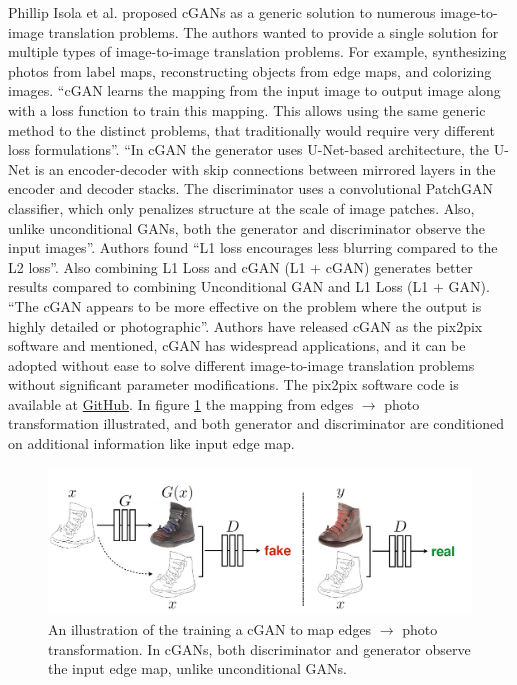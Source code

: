 Phillip Isola et al.\cite{isola2018imagetoimage} proposed \acp{cGAN} as a generic solution to numerous image-to-image translation problems. The authors wanted to provide a single solution for multiple types of image-to-image translation problems. For example, synthesizing photos from label maps\cite{cordts2016cityscapes}, reconstructing objects from edge maps\cite{zhu2018generative}\cite{6909426}, and colorizing images\cite{wesley2021colorizing}. ``\ac{cGAN} learns the mapping from the input image to output image along with a loss function to train this mapping. This allows using the same generic method to the distinct problems, that traditionally would require very different loss formulations''\cite{isola2018imagetoimage}. ``In \ac{cGAN} the generator uses U-Net-based architecture, the U-Net is an encoder-decoder with skip connections between mirrored layers in the encoder and decoder stacks\cite{ronneberger2015unet}. The discriminator uses a convolutional PatchGAN classifier, which only penalizes structure at the scale of image patches\cite{li2016precomputed}. Also, unlike unconditional \acp{GAN}, both the generator and discriminator observe the input images''\cite{isola2018imagetoimage}. Authors found ``L1 loss encourages less blurring compared to the L2 loss''\cite{isola2018imagetoimage}. Also combining L1 Loss and \ac{cGAN} (L1 + \ac{cGAN}) generates better results compared to combining Unconditional \ac{GAN} and L1 Loss (L1 + \ac{GAN}). ``The \ac{cGAN} appears to be more effective on the problem where the output is highly detailed or photographic''\cite{isola2018imagetoimage}. Authors have released \ac{cGAN} as the pix2pix software and mentioned, \ac{cGAN} has widespread applications, and it can be adopted without ease to solve different image-to-image translation problems without significant parameter modifications. The pix2pix software code is available at \href{https://github.com/phillipi/pix2pix.}{GitHub}. In figure \ref{fig:CGAN} the mapping from edges $\rightarrow$ photo transformation illustrated, and both generator and discriminator are conditioned on additional information like input edge map\cite{isola2018imagetoimage}.


\begin{figure}[H]
        \begin{center}
 	    \includegraphics[scale=0.30]{images/relatedWorks/CGAN.png}
	    \caption[An illustration of training a \ac{cGAN} to map edges $\rightarrow$	 photo transformation.]{An illustration of the training a \ac{cGAN} to map edges $\rightarrow$ photo transformation. In \acp{cGAN}, both discriminator and generator observe the input edge map, unlike unconditional \acp{GAN}\cite{isola2018imagetoimage}.}
	    \label{fig:CGAN}
	    \end{center}
\end{figure}

